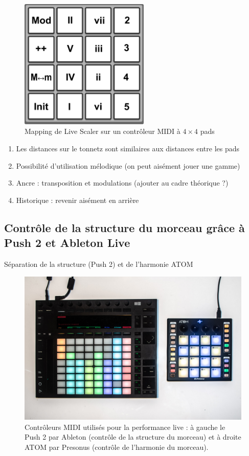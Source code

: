 \documentclass[french,11pt]{article}
\begin{document}
\begin{figure}[htbp]
  \centering
  \includegraphics[width=0.55\textwidth]{Figures/Pads-config.pdf}
  \caption{Mapping de Live Scaler sur un contrôleur MIDI à $4\times 4$ pads}
\end{figure}
\begin{enumerate}
  \item Les distances sur le tonnetz sont similaires aux distances entre les pads
  \item Possibilité d'utilisation mélodique (on peut aisément jouer une gamme)
  \item Ancre : transposition et modulations (ajouter au cadre théorique ?)
  \item Historique : revenir aisément en arrière
\end{enumerate}

\subsection{Contrôle de la structure du morceau grâce à Push 2 et Ableton Live}
Séparation de la structure (Push 2) et de l'harmonie ATOM

\begin{figure}[htbp]
  \centering
  \includegraphics[width=\textwidth]{Figures/IMGP9899.jpg}
  \caption{Contrôleurs MIDI utilisés pour la performance live : à gauche le Push 2 par Ableton (contrôle de la structure du morceau) et à droite ATOM par Presonus (contrôle de l'harmonie du morceau).}
\end{figure}
\end{document}
